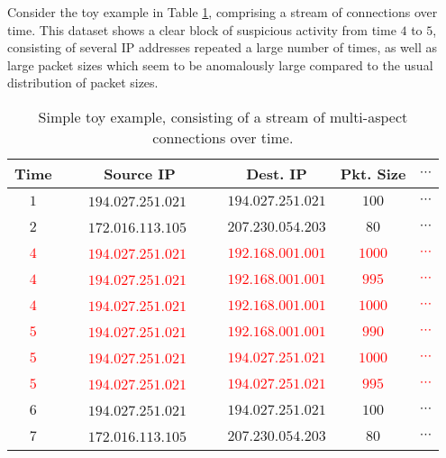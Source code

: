 \documentclass[sigconf]{acmart}
\begin{document}
Consider the toy example in Table \ref{tab:toy}, comprising a stream of connections over time. This dataset shows a clear block of suspicious activity from time $4$ to $5$, consisting of several IP addresses repeated a large number of times, as well as large packet sizes which seem to be anomalously large compared to the usual distribution of packet sizes.
\begin{table}[!htb]
\centering
\caption{Simple toy example, consisting of a stream of multi-aspect connections over time.}
\label{tab:toy}
\addtolength{\tabcolsep}{-2pt}
\begin{tabular}{@{}ccccc@{}}
\toprule
{\bf Time} & {\bf Source IP} & {\bf Dest. IP} & {\bf Pkt. Size} & {\bf $\cdots$} \\ \midrule
$1$ & \ \ \ $194.027.251.021$ \ \ \ & $194.027.251.021$ & $100$ & $\cdots$ \\
$2$ & \ \ \ $172.016.113.105$ \ \ \ & $207.230.054.203$ & $80$ & $\cdots$ \\
\textcolor{red}{$4$} & \ \ \ \textcolor{red}{$194.027.251.021$} \ \ \ & \textcolor{red}{$192.168.001.001$} & \textcolor{red}{$1000$} & \textcolor{red}{$\cdots$} \\
\textcolor{red}{$4$} & \ \ \ \textcolor{red}{$194.027.251.021$} \ \ \ & \textcolor{red}{$192.168.001.001$} & \textcolor{red}{$995$} & \textcolor{red}{$\cdots$} \\
\textcolor{red}{$4$} & \ \ \ \textcolor{red}{$194.027.251.021$} \ \ \ & \textcolor{red}{$192.168.001.001$} & \textcolor{red}{$1000$} & \textcolor{red}{$\cdots$} \\
\textcolor{red}{$5$} & \ \ \ \textcolor{red}{$194.027.251.021$} \ \ \ & \textcolor{red}{$192.168.001.001$} & \textcolor{red}{$990$} & \textcolor{red}{$\cdots$} \\
\textcolor{red}{$5$} & \ \ \ \textcolor{red}{$194.027.251.021$} \ \ \ & \textcolor{red}{$194.027.251.021$} & \textcolor{red}{$1000$} & \textcolor{red}{$\cdots$} \\
\textcolor{red}{$5$} & \ \ \ \textcolor{red}{$194.027.251.021$} \ \ \ & \textcolor{red}{$194.027.251.021$} & \textcolor{red}{$995$} & \textcolor{red}{$\cdots$} \\
$6$ & \ \ \ $194.027.251.021$ \ \ \ & $194.027.251.021$ & $100$ & $\cdots$ \\
$7$ & \ \ \ $172.016.113.105$ \ \ \ & $207.230.054.203$ & $80$ & $\cdots$ \\
\bottomrule
\end{tabular}
\end{table}
\end{document}
